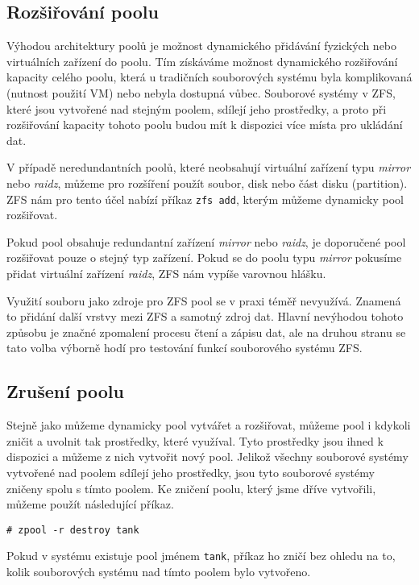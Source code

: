 \subsection{Rozšiřování poolu}
Výhodou architektury poolů je možnost dynamického přidávání fyzických nebo virtuálních zařízení do poolu. Tím získáváme možnost dynamického rozšiřování kapacity celého poolu, která u tradičních souborových systému byla komplikovaná (nutnost použití VM) nebo nebyla dostupná vůbec. Souborové systémy v ZFS, které jsou vytvořené nad stejným poolem, sdílejí jeho prostředky, a proto při rozšiřování kapacity tohoto poolu budou mít k dispozici více místa pro ukládání dat.

V případě neredundantních poolů, které neobsahují virtuální zařízení typu \emph{mirror} nebo \emph{raidz}, můžeme pro rozšíření použít soubor, disk nebo část disku (partition). ZFS nám pro tento účel nabízí příkaz \verb|zfs add|, kterým můžeme dynamicky pool rozšiřovat.

Pokud pool obsahuje redundantní zařízení \emph{mirror} nebo \emph{raidz}, je doporučené pool rozšiřovat pouze o stejný typ zařízení. Pokud se do poolu typu \emph{mirror} pokusíme přidat virtuální zařízení \emph{raidz}, ZFS nám vypíše varovnou hlášku.

Využití souboru jako zdroje pro ZFS pool se v praxi téměř nevyužívá. Znamená to přidání další vrstvy mezi ZFS a samotný zdroj dat. Hlavní nevýhodou tohoto způsobu je značné zpomalení procesu čtení a zápisu dat, ale na druhou stranu se tato volba výborně hodí pro testování funkcí souborového systému ZFS.

\subsection{Zrušení poolu}
Stejně jako můžeme dynamicky pool vytvářet a rozšiřovat, můžeme pool i kdykoli zničit a uvolnit tak prostředky, které využíval. Tyto prostředky jsou ihned k dispozici a můžeme z nich vytvořit nový pool. Jelikož všechny souborové systémy vytvořené nad poolem sdílejí jeho prostředky, jsou tyto souborové systémy zničeny spolu s tímto poolem. Ke zničení poolu, který jsme dříve vytvořili, můžeme použít následující příkaz.
\begin{verbatim}
# zpool -r destroy tank
\end{verbatim}
Pokud v systému existuje pool jménem \verb|tank|, příkaz ho zničí bez ohledu na to, kolik souborových systému nad tímto poolem bylo vytvořeno.

